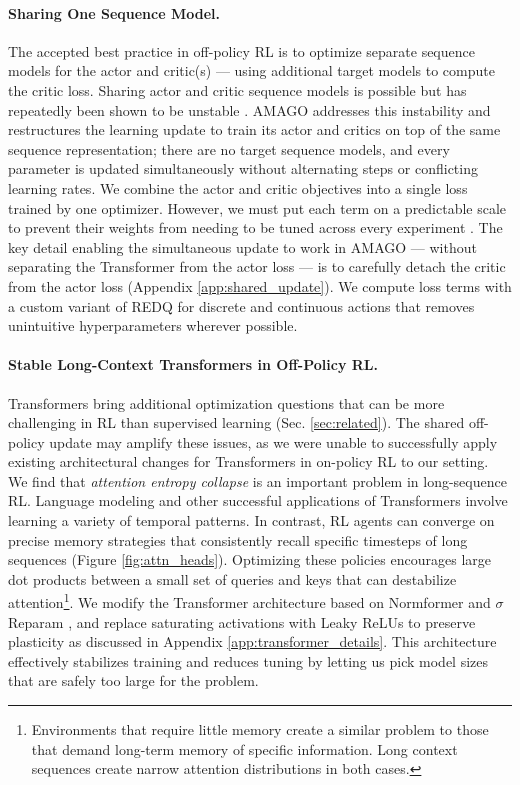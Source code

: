 \documentclass{article}
\begin{document}
\paragraph{Sharing One Sequence Model.} The accepted best practice in off-policy RL is to optimize separate sequence models for the actor and critic(s) --- using additional target models to compute the critic loss. Sharing actor and critic sequence models is possible but has repeatedly been shown to be unstable \cite{ni2022recurrent, yang2021recurrent, yarats2021improving}. AMAGO addresses this instability and restructures the learning update to train its actor and critics on top of the same sequence representation; there are no target sequence models, and every parameter is updated simultaneously without alternating steps or conflicting learning rates. We combine the actor and critic objectives into a single loss trained by one optimizer. However, we must put each term on a predictable scale to prevent their weights from needing to be tuned across every experiment \cite{van2016learning, hafner2020mastering}. The key detail enabling the simultaneous update to work in AMAGO --- without separating the Transformer from the actor loss \cite{yarats2021improving, yang2021recurrent} --- is to carefully detach the critic from the actor loss (Appendix \ref{app:shared_update}). We compute loss terms with a custom variant of REDQ \cite{chen2021randomized} for discrete and continuous actions that removes unintuitive hyperparameters wherever possible.
\paragraph{Stable Long-Context Transformers in Off-Policy RL.} Transformers bring additional optimization questions that can be more challenging in RL than supervised learning (Sec. \ref{sec:related}). The shared off-policy update may amplify these issues, as we were unable to successfully apply existing architectural changes for Transformers in on-policy RL \cite{parisotto2020stabilizing, melo2022transformers} to our setting. We find that \textit{attention entropy collapse} \cite{zhai2023stabilizing} is an important problem in long-sequence RL. Language modeling and other successful applications of Transformers involve learning a variety of temporal patterns. In contrast, RL agents can converge on precise memory strategies that consistently recall specific timesteps of long sequences (Figure \ref{fig:attn_heads}). Optimizing these policies encourages large dot products between a small set of queries and keys that can destabilize attention\footnote{Environments that require little memory create a similar problem to those that demand long-term memory of specific information. Long context sequences create narrow attention distributions in both cases.}. We modify the Transformer architecture based on Normformer \cite{shleifer2021normformer} and $\sigma$Reparam \cite{zhai2023stabilizing}, and replace saturating activations with Leaky ReLUs to preserve plasticity \cite{abbas2023loss, li2023efficient} as discussed in Appendix \ref{app:transformer_details}. This architecture effectively stabilizes training and reduces tuning by letting us pick model sizes that are safely too large for the problem.
\end{document}
